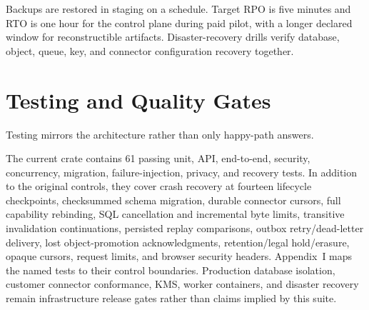 \documentclass[10pt]{article}
\begin{document}
Backups are restored in staging on a schedule. Target RPO is five minutes and RTO is one hour for the control plane during paid pilot, with a longer declared window for reconstructible artifacts. Disaster-recovery drills verify database, object, queue, key, and connector configuration recovery together.

\section{Testing and Quality Gates}

Testing mirrors the architecture rather than only happy-path answers.

The current crate contains 61 passing unit, API, end-to-end, security, concurrency, migration, failure-injection, privacy, and recovery tests. In addition to the original controls, they cover crash recovery at fourteen lifecycle checkpoints, checksummed schema migration, durable connector cursors, full capability rebinding, SQL cancellation and incremental byte limits, transitive invalidation continuations, persisted replay comparisons, outbox retry/dead-letter delivery, lost object-promotion acknowledgments, retention/legal hold/erasure, opaque cursors, request limits, and browser security headers. Appendix~I maps the named tests to their control boundaries. Production database isolation, customer connector conformance, KMS, worker containers, and disaster recovery remain infrastructure release gates rather than claims implied by this suite.
\end{document}
